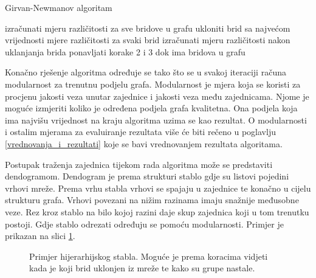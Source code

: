 \bigskip
\begin{algorithm}
\caption{Girvan-Newmanov algoritam}
\begin{algorithmic}[1]
	\STATE izračunati mjeru različitosti za sve bridove u grafu
	\STATE ukloniti brid sa najvećom vrijednosti mjere različitosti
	\STATE za svaki brid izračunati mjeru različitosti nakon uklanjanja brida
	\STATE ponavljati korake 2 i 3 dok ima bridova u grafu
\end{algorithmic}
\end{algorithm}
\bigskip

Konačno rješenje algoritma određuje se tako što se u svakoj iteraciji računa modularnost za trenutnu podjelu grafa. Modularnost je mjera koja se koristi za procjenu jakosti veza unutar zajednice i jakosti veza među zajednicama. Njome je moguće izmjeriti koliko je određena podjela grafa kvalitetna. Ona podjela koja ima najvišu vrijednost na kraju algoritma uzima se kao rezultat. O modularnosti i ostalim mjerama za evaluiranje rezultata više će biti rečeno u poglavlju \ref{vrednovanja_i_rezultati} koje se bavi vrednovanjem rezultata algoritama.


Postupak traženja zajednica tijekom rada algoritma može se predstaviti dendogramom. Dendogram je prema strukturi stablo gdje su listovi pojedini vrhovi mreže. Prema vrhu stabla vrhovi se spajaju u zajednice te konačno u cijelu strukturu grafa. Vrhovi povezani na nižim razinama imaju snažnije međusobne veze. Rez kroz stablo na bilo kojoj razini daje skup zajednica koji u tom trenutku postoji. Gdje stablo odrezati određuju se pomoću modularnosti. Primjer je prikazan na slici \ref{fig:dendogram}.

\begin{figure}
	\caption{Primjer hijerarhijskog stabla. Moguće je prema koracima vidjeti kada je koji brid uklonjen iz mreže te kako su grupe nastale.}
	\label{fig:dendogram}
\end{figure}

